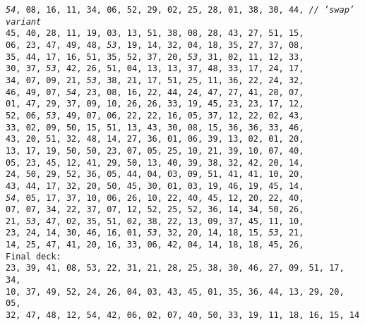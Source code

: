 \documentclass[a4paper,parskip,12pt]{scrartcl}
\begin{document}
\setlength{\baselineskip}{1cm}

   \texttt{\emph{54}, 08, 16, 11, 34, 06, 52, 29, 02, 25, 28, 01, 38, 30, 44, \emph{// 'swap' variant}}
\\ \texttt{45, 40, 28, 11, 19, 03, 13, 51, 38, 08, 28, 43, 27, 51, 15,}
\\ \texttt{06, 23, 47, 49, 48, \emph{53}, 19, 14, 32, 04, 18, 35, 27, 37, 08,}
\\ \texttt{35, 44, 17, 16, 51, 35, 52, 37, 20, \emph{53}, 31, 02, 11, 12, 33,}
\\ \texttt{30, 37, \emph{53}, 42, 26, 51, 04, 13, 13, 37, 48, 33, 17, 24, 17,}
\\ \texttt{34, 07, 09, 21, \emph{53}, 38, 21, 17, 51, 25, 11, 36, 22, 24, 32,}
\\ \texttt{46, 49, 07, \emph{54}, 23, 08, 16, 22, 44, 24, 47, 27, 41, 28, 07,}
\\ \texttt{01, 47, 29, 37, 09, 10, 26, 26, 33, 19, 45, 23, 23, 17, 12,}
\\ \texttt{52, 06, \emph{53}, 49, 07, 06, 22, 22, 16, 05, 37, 12, 22, 02, 43,}
\\ \texttt{33, 02, 09, 50, 15, 51, 13, 43, 30, 08, 15, 36, 36, 33, 46,}
\\ \texttt{43, 20, 51, 32, 48, 14, 27, 36, 01, 06, 39, 13, 02, 01, 20,}
\\ \texttt{13, 17, 19, 50, 50, 23, 07, 05, 25, 10, 21, 39, 10, 07, 40,}
\\ \texttt{05, 23, 45, 12, 41, 29, 50, 13, 40, 39, 38, 32, 42, 20, 14,}
\\ \texttt{24, 50, 29, 52, 36, 05, 44, 04, 03, 09, 51, 41, 41, 10, 20,}
\\ \texttt{43, 44, 17, 32, 20, 50, 45, 30, 01, 03, 19, 46, 19, 45, 14,}
\\ \texttt{\emph{54}, 05, 17, 37, 10, 06, 26, 10, 22, 40, 45, 12, 20, 22, 40,}
\\ \texttt{07, 07, 34, 22, 37, 07, 12, 52, 25, 52, 36, 14, 34, 50, 26,}
\\ \texttt{21, \emph{53}, 47, 02, 35, 51, 02, 38, 22, 13, 09, 37, 45, 11, 10,}
\\ \texttt{23, 24, 14, 30, 46, 16, 01, \emph{53}, 32, 20, 14, 18, 15, \emph{53}, 21,}
\\ \texttt{14, 25, 47, 41, 20, 16, 33, 06, 42, 04, 14, 18, 18, 45, 26,}
\\ \texttt{Final deck: \\ 23, 39, 41, 08, 53, 22, 31, 21, 28, 25, 38, 30, 46, 27, 09, 51, 17, 34, \\ 10, 37, 49, 52, 24, 26, 04, 03, 43, 45, 01, 35, 36, 44, 13, 29, 20, 05, \\ 32, 47, 48, 12, 54, 42, 06, 02, 07, 40, 50, 33, 19, 11, 18, 16, 15, 14}
\end{document}
